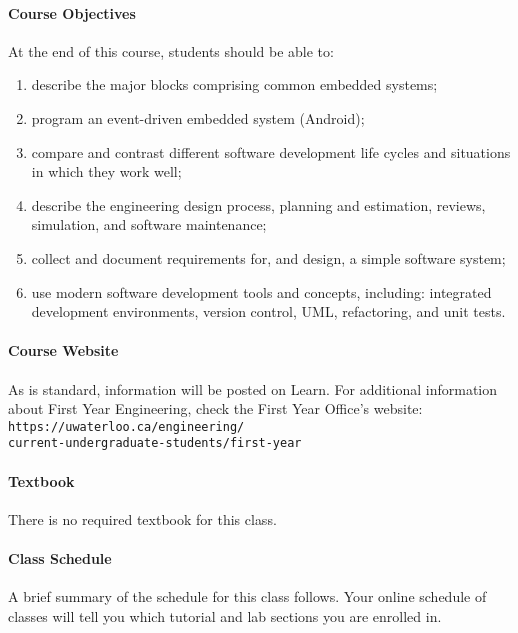 \documentclass[letterpaper,10pt]{article}
\begin{document}
\paragraph{Course Objectives} At the end of this course, students should be able to:
\begin{enumerate}
\itemsep0em
        \item describe the major blocks comprising common embedded systems;
        \item program an event-driven embedded system (Android);
        \item compare and contrast different software development life cycles and situations in which they work well;
        \item describe the engineering design process, planning and estimation, reviews, simulation, and software maintenance;
        \item collect and document requirements for, and design, a simple software system;
        \item use modern software development tools and concepts, including: integrated development environments, version control, UML, refactoring, and unit tests.
\end{enumerate}

\paragraph{Course Website} As is standard, information will be posted on Learn.
For additional information about First Year Engineering, check the First Year Office's website:
\texttt{https://uwaterloo.ca/engineering/\\current-undergraduate-students/first-year}


\paragraph{Textbook} There is no required textbook for this class.



\paragraph{Class Schedule}

A brief summary of the schedule for this class follows. Your online schedule of classes will tell you which tutorial and lab sections you are enrolled in.
\end{document}
